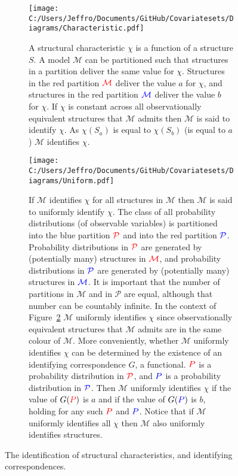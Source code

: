 \documentclass[10pt,a4paper,twoside]{article}
\numberwithin{equation}{subsection}
\begin{document}
\begin{figure}[p]
\centering
\begin{subfigure}{0.8\textwidth}
  \centering
  \texttt{[image: C:/Users/Jeffro/Documents/GitHub/Covariatesets/Diagrams/Characteristic.pdf]}
  \caption{A structural characteristic $\chi$ is a function of a structure $S$. A model $\mathcal{M}$ can be partitioned such that structures in a partition deliver the same value for $\chi$. Structures in the red partition $\color{red}\mathcal{M}$ deliver the value $a$ for $\chi$, and structures in the red partition $\color{blue}\mathcal{M}$ deliver the value $b$ for $\chi$. If $\chi$ is constant across all observationally equivalent structures that $\mathcal{M}$ admits then $\mathcal{M}$ is said to identify $\chi$. As $\chi(S_a)$ is equal to $\chi(S_b)$ (is equal to $a$) $\mathcal{M}$ identifies $\chi$.}
  \label{fig:characteristic}
  \end{subfigure}
  \begin{subfigure}{0.8\textwidth}
  \centering
  \texttt{[image: C:/Users/Jeffro/Documents/GitHub/Covariatesets/Diagrams/Uniform.pdf]}
  \caption{If $\mathcal{M}$ identifies $\chi$ for all structures in $\mathcal{M}$ then $\mathcal{M}$ is said to uniformly identify $\chi$. The class of all probability distributions (of observable variables) is partitioned into the blue partition $\color{red}\mathcal{P}$ and into the red partition $\color{blue}\mathcal{P}$. Probability distributions in $\color{red}\mathcal{P}$ are generated by (potentially many) structures in $\color{red}\mathcal{M}$, and probability distributions in $\color{blue}\mathcal{P}$ are generated by (potentially many) structures in $\color{blue}\mathcal{M}$. It is important that the number of partitions in $\mathcal{M}$ and in $\mathcal{P}$ are equal, although that number can be countably infinite. In the context of Figure~\ref{fig:uniform} $\mathcal{M}$ uniformly identifies $\chi$ since observationally equivalent structures that $\mathcal{M}$ admits are in the same colour of $\mathcal{M}$. More conveniently, whether $\mathcal{M}$ uniformly identifies $\chi$ can be determined by the existence of an identifying correspondence $G$, a functional. $\color{red}P$ is a probability distribution in $\color{red}\mathcal{P}$, and $\color{blue}P$ is a probability distribution in $\color{blue}\mathcal{P}$. Then $\mathcal{M}$ uniformly identifies $\chi$ if the value of $G(\color{red}P\color{black})$ is $a$ and if the value of $G(\color{blue}P\color{black})$ is $b$, holding for any such $\color{red}P$ and $\color{blue}P$. Notice that if $\mathcal{M}$ uniformly identifies all $\chi$ then $\mathcal{M}$ also uniformly identifies structures.}
  \label{fig:uniform}
  \end{subfigure}
  \caption{The identification of structural characteristics, and identifying correspondences.}
  \label{fig:characteristics}
\end{figure}
\end{document}
